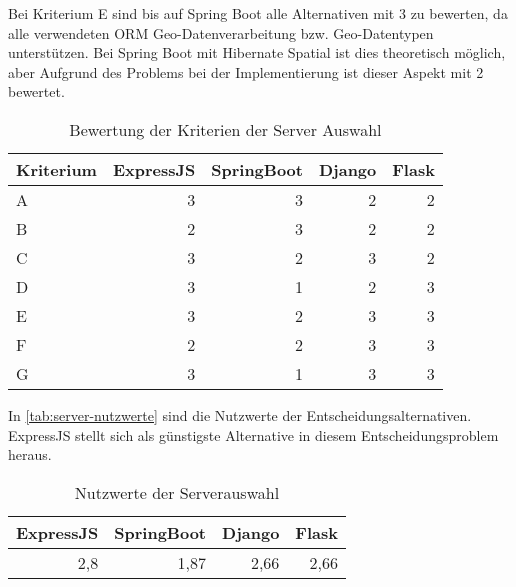 Bei Kriterium E sind bis auf Spring Boot alle Alternativen mit 3 zu bewerten, da alle verwendeten \ac{ORM} Geo-Datenverarbeitung bzw. Geo-Datentypen unterstützen.
Bei Spring Boot mit Hibernate Spatial ist dies theoretisch möglich, aber Aufgrund des Problems bei der Implementierung ist dieser Aspekt mit 2 bewertet.

\begin{table}[h]
	\caption{Bewertung der Kriterien der Server Auswahl}
	\begin{center}
		\begin{tabular}{lrrrr}
			\toprule
			Kriterium & \multicolumn{1}{l}{ExpressJS} & \multicolumn{1}{l}{SpringBoot} & \multicolumn{1}{l}{Django} & \multicolumn{1}{l}{Flask} \\ \midrule
			A         &                             3 &                              3 &                          2 &                         2 \\
			B         &                             2 &                              3 &                          2 &                         2 \\
			C         &                             3 &                              2 &                          3 &                         2 \\
			D         &                             3 &                              1 &                          2 &                         3 \\
			E         &                             3 &                              2 &                          3 &                         3 \\
			F         &                             2 &                              2 &                          3 &                         3 \\
			G         &                             3 &                              1 &                          3 &                         3 \\ \bottomrule
		\end{tabular}
	\end{center}
	\label{tab:server-bewertung}
\end{table}

In \autoref{tab:server-nutzwerte} sind die Nutzwerte der Entscheidungsalternativen.
ExpressJS stellt sich als günstigste Alternative in diesem Entscheidungsproblem heraus.

\begin{table}[h]
	\caption{Nutzwerte der Serverauswahl}
	\begin{center}
		\begin{tabular}{rrrr}
			\toprule
			\multicolumn{1}{l}{ExpressJS} & \multicolumn{1}{l}{SpringBoot} & \multicolumn{1}{l}{Django} & \multicolumn{1}{l}{Flask} \\ \midrule
			                          2,8 &                           1,87 &                       2,66 &                      2,66 \\ \bottomrule
		\end{tabular}
	\end{center}
	\label{tab:server-nutzwerte}
\end{table}


